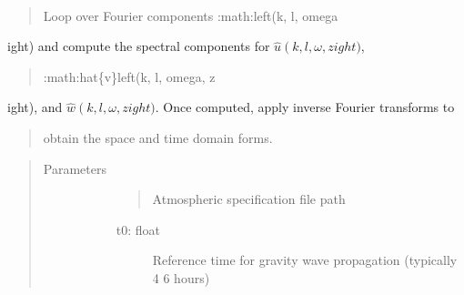 \documentclass[letterpaper,10pt,english]{sphinxmanual}
\begin{document}
\begin{fulllineitems}
\label{\detokenize{stochprop.gravity:stochprop.gravity_waves.perturbations}}~\begin{quote}

\sphinxAtStartPar
Loop over Fourier components :math:{\color{red}\bfseries{}\textasciigrave{}}left(k, l, omega
\end{quote}

\sphinxAtStartPar
ight)\textasciigrave{} and compute the spectral components for \(\hat{u} \left(k, l, \omega, z 
ight)\),
\begin{quote}

\sphinxAtStartPar
:math:{\color{red}\bfseries{}\textasciigrave{}}hat\{v\}left(k, l, omega, z
\end{quote}

\sphinxAtStartPar
ight)\textasciigrave{}, and \(\hat{w} \left(k, l, \omega, z 
ight)\).  Once computed, apply inverse Fourier transforms to
\begin{quote}

\sphinxAtStartPar
obtain the space and time domain forms.
\end{quote}
\begin{quote}\begin{description}
\item[{Parameters}] \leavevmode\begin{description}
\item[{}] \leavevmode\begin{quote}

\sphinxAtStartPar
Atmospheric specification file path
\end{quote}
\begin{description}
\item[{t0: float}] \leavevmode
\sphinxAtStartPar
Reference time for gravity wave propagation (typically 4 \sphinxhyphen{} 6 hours)


\end{description}
\end{description}
\end{description}
\end{quote}
\end{fulllineitems}
\end{document}
